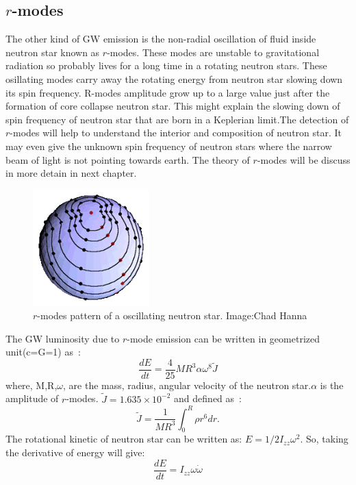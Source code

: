 \documentclass{ttuthes2007}
\begin{document}
\subsection{$r$-modes}
The other kind of \ac{GW} emission is the non-radial oscillation of fluid
inside neutron star known as $r$-modes. These modes are unstable to
gravitational radiation so probably lives for a long time in a rotating neutron
stars. These osillating modes carry away the rotating energy from neutron star
slowing down its spin frequency. R-modes amplitude grow up to a large value just
after the formation of core collapse neutron star. This might explain the
slowing down of spin frequency of neutron star that are born in a Keplerian
limit.The detection of $r$-modes will help to
understand the interior and composition of neutron star. It may even give the
unknown spin frequency of neutron stars where the narrow beam of light is not
pointing towards earth. The theory of $r$-modes will be discuss in more detain in next chapter.
\begin{figure}
\centering
	\includegraphics[width=0.4\textwidth]{figure/333.png}
	\caption{$r$-modes pattern of a oscillating neutron star. Image:Chad
Hanna}
\end{figure}
The \ac{GW} luminosity due to $r$-mode emission can be written in geometrized
unit(c=G=1) as~\cite{Owen:2010ng}:
\begin{equation}\label{eq:modeenergy}
\frac{dE}{dt}=\frac{4}{25}M R^3 \alpha \omega^8\tilde{J}
\end{equation}
where, M,R,$\omega$, are the mass, radius, angular velocity of the neutron
star.$\alpha$ is the amplitude of $r$-modes. $\tilde{J}=1.635\times10^{-2}$ and
defined as~\cite{Owen:1998xg}:
\begin{equation}
\tilde{J}=\frac{1}{MR^3}\int_0^R\rho r^6dr.
\end{equation}
The rotational kinetic of neutron star can be written as:
$E=1/2I_{zz}\omega^2$. So, taking the derivative of energy will give:
\begin{equation}\label{eq:rotenergy}
\frac{dE}{dt}= I_{zz}\omega\dot{\omega}
\end{equation}
\end{document}
